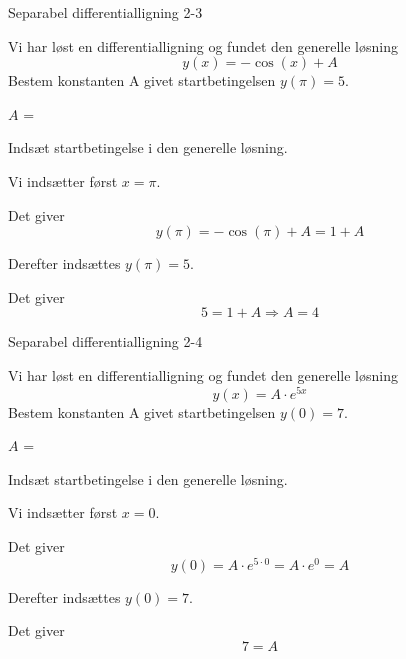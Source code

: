 \documentclass{article}
\begin{document}
\begin{exercise}{Separabel differentialligning 2-3}

	Vi har løst en differentialligning og fundet den generelle løsning
	\[
	y(x) = - \cos(x) + A
	\]
	Bestem konstanten A givet startbetingelsen $y(\pi)=5$.
	
	$A$ = 
	
	\hint
	
	Indsæt startbetingelse i den generelle løsning. 
	
	
	\hint
	
	Vi indsætter først $x=\pi$.
	
	\hint
	
	Det giver
	\[
	y(\pi)= -\cos (\pi) + A = 1 + A
	\]
	
	\hint
	
	Derefter indsættes $y(\pi)=5$.
	
	\hint 
	
	Det giver 
	\[
	5 = 1 + A  \Rightarrow A = 4
	\]
	
\end{exercise}

\newpage


\begin{exercise}{Separabel differentialligning 2-4}

	
	Vi har løst en differentialligning og fundet den generelle løsning
	\[
	y(x) =  A \cdot e^{5x}
	\]
	Bestem konstanten A givet startbetingelsen $y(0)=7$.
	
	$A$ = 
	
	\hint
	
	Indsæt startbetingelse i den generelle løsning. 
	
	
	\hint
	
	Vi indsætter først $x=0$.
	
	\hint
	
	Det giver
	\[
	y(0)=  A \cdot e^{5 \cdot 0} = A \cdot e^0  = A
	\]
	
	\hint
	
	Derefter indsættes $y(0)=7$.
	
	\hint 
	
	Det giver 
	\[
	7  = A  
	\]
	
\end{exercise}

\newpage
\end{document}
